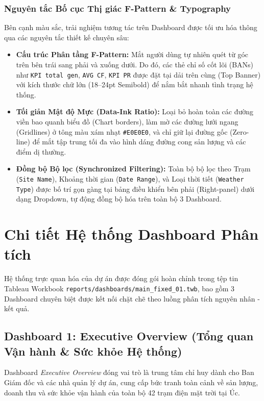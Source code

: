 \documentclass[12pt, a4paper]{report}
\begin{document}
\subsubsection{Nguyên tắc Bố cục Thị giác F-Pattern \& Typography}

Bên cạnh màu sắc, trải nghiệm tương tác trên Dashboard được tối ưu hóa thông qua các nguyên tắc thiết kế chuyên sâu:
\begin{itemize}
    \item \textbf{Cấu trúc Phân tầng F-Pattern:} Mắt người dùng tự nhiên quét từ góc trên bên trái sang phải và xuống dưới. Do đó, các thẻ chỉ số cốt lõi (BANs) như \texttt{KPI total gen}, \texttt{AVG CF}, \texttt{KPI PR} được đặt tại dải trên cùng (Top Banner) với kích thước chữ lớn (18--24pt Semibold) để nắm bắt nhanh tình trạng hệ thống.
    \item \textbf{Tối giản Mật độ Mực (Data-Ink Ratio):} Loại bỏ hoàn toàn các đường viền bao quanh biểu đồ (Chart borders), làm mờ các đường lưới ngang (Gridlines) ở tông màu xám nhạt \texttt{\#E0E0E0}, và chỉ giữ lại đường gốc (Zero-line) để mắt tập trung tối đa vào hình dáng đường cong sản lượng và các điểm dị thường.
    \item \textbf{Đồng bộ Bộ lọc (Synchronized Filtering):} Toàn bộ bộ lọc theo Trạm (\texttt{Site Name}), Khoảng thời gian (\texttt{Date Range}), và Loại thời tiết (\texttt{Weather Type}) được bố trí gọn gàng tại bảng điều khiển bên phải (Right-panel) dưới dạng Dropdown, tự động đồng bộ hóa trên toàn bộ 3 Dashboard.
\end{itemize}

\section{Chi tiết Hệ thống Dashboard Phân tích}
\label{sec:dashboard_details}

Hệ thống trực quan hóa của dự án được đóng gói hoàn chỉnh trong tệp tin Tableau Workbook \texttt{reports/dashboards/main\_fixed\_01.twb}, bao gồm 3 Dashboard chuyên biệt được kết nối chặt chẽ theo luồng phân tích nguyên nhân - kết quả.

\subsection{Dashboard 1: Executive Overview (Tổng quan Vận hành \& Sức khỏe Hệ thống)}
\label{subsec:db_overview}

Dashboard \textit{Executive Overview} đóng vai trò là trung tâm chỉ huy dành cho Ban Giám đốc và các nhà quản lý dự án, cung cấp bức tranh toàn cảnh về sản lượng, doanh thu và sức khỏe vận hành của toàn bộ 42 trạm điện mặt trời tại Úc.
\end{document}
